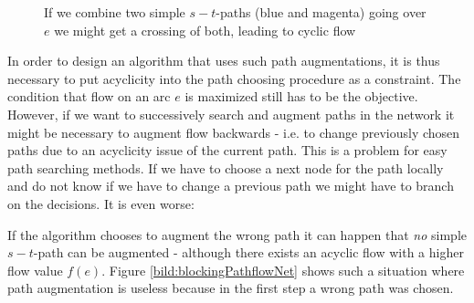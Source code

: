 \begin{figure}[h!]
\centering
{}
\caption{If we combine two simple $s-t$-paths (blue and magenta) going over $e$ we might get a crossing of both, 
leading to cyclic flow}
 \label{bild:cycleFromDifferentCombinedPaths}
\end{figure}

In order to design an algorithm that uses such path augmentations, it is thus necessary to put acyclicity into the path 
choosing procedure as a constraint. The condition that flow on an arc $e$ is maximized still has to be the objective.
However, if we want to successively search and augment paths in the network it might be necessary to augment flow 
backwards - i.e. to change previously chosen paths due to an acyclicity issue of the current path.
This is a problem for easy path searching methods. If we have to choose a next node for the path locally and do not 
know if we have to change a previous path we might have to branch on the decisions. It is even worse: 

If the algorithm chooses to augment the wrong path it can happen that \textit{no} simple $s-t$-path can be augmented -
although there exists an acyclic flow with a higher flow value $f(e)$. Figure \ref{bild:blockingPathflowNet} shows such 
a situation where path augmentation is useless because in the first step a wrong path was chosen. 

